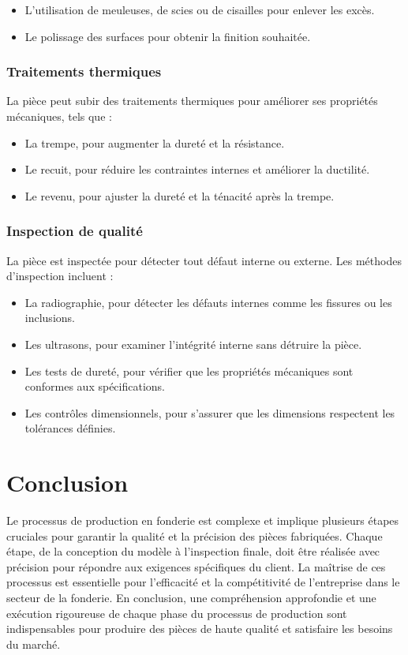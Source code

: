 \documentclass[12pt]{article}
\begin{document}
\begin{itemize}
    \item L'utilisation de meuleuses, de scies ou de cisailles pour enlever les excès.
    \item Le polissage des surfaces pour obtenir la finition souhaitée.
\end{itemize}

\subsubsection{Traitements thermiques}
La pièce peut subir des traitements thermiques pour améliorer ses propriétés mécaniques, tels que :

\begin{itemize}
    \item La trempe, pour augmenter la dureté et la résistance.
    \item Le recuit, pour réduire les contraintes internes et améliorer la ductilité.
    \item Le revenu, pour ajuster la dureté et la ténacité après la trempe.
\end{itemize}

\subsubsection{Inspection de qualité}
La pièce est inspectée pour détecter tout défaut interne ou externe. Les méthodes d'inspection incluent :

\begin{itemize}
    \item La radiographie, pour détecter les défauts internes comme les fissures ou les inclusions.
    \item Les ultrasons, pour examiner l'intégrité interne sans détruire la pièce.
    \item Les tests de dureté, pour vérifier que les propriétés mécaniques sont conformes aux spécifications.
    \item Les contrôles dimensionnels, pour s'assurer que les dimensions respectent les tolérances définies.
\end{itemize}

\section{Conclusion}
Le processus de production en fonderie est complexe et implique plusieurs étapes cruciales pour garantir la qualité et la précision des pièces fabriquées. Chaque étape, de la conception du modèle à l'inspection finale, doit être réalisée avec précision pour répondre aux exigences spécifiques du client. La maîtrise de ces processus est essentielle pour l'efficacité et la compétitivité de l'entreprise dans le secteur de la fonderie. En conclusion, une compréhension approfondie et une exécution rigoureuse de chaque phase du processus de production sont indispensables pour produire des pièces de haute qualité et satisfaire les besoins du marché.
\end{document}
